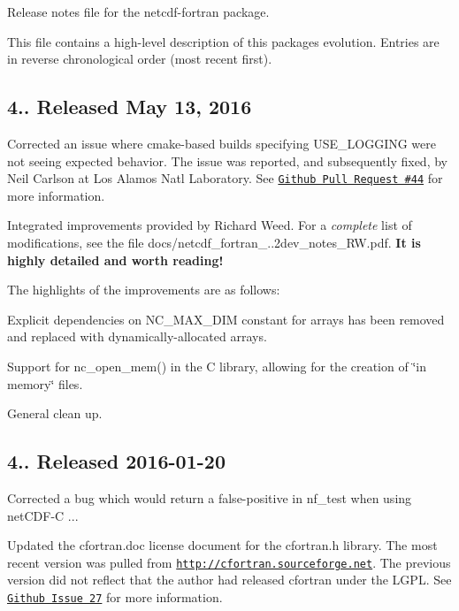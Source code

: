 Release notes file for the netcdf-\/fortran package.

This file contains a high-\/level description of this package\textquotesingle{}s evolution. Entries are in reverse chronological order (most recent first).

\subsection*{4.. Released May 13, 2016}


\begin{DoxyItemize}
\item Corrected an issue where cmake-\/based builds specifying {\ttfamily U\+S\+E\+\_\+\+L\+O\+G\+G\+I\+NG} were not seeing expected behavior. The issue was reported, and subsequently fixed, by Neil Carlson at Los Alamos Nat\textquotesingle{}l Laboratory. See \href{https://github.com/Unidata/netcdf-fortran/pull/44}{\tt Github Pull Request \#44} for more information.
\item Integrated improvements provided by Richard Weed. For a {\itshape complete} list of modifications, see the file {\ttfamily docs/netcdf\+\_\+fortran\+\_..\+2dev\+\_\+notes\+\_\+\+R\+W.\+pdf}. {\bfseries It is highly detailed and worth reading!}

The highlights of the improvements are as follows\+:
\begin{DoxyItemize}
\item Explicit dependencies on {\ttfamily N\+C\+\_\+\+M\+A\+X\+\_\+\+D\+IM} constant for arrays has been removed and replaced with dynamically-\/allocated arrays.
\item Support for {\ttfamily nc\+\_\+open\+\_\+mem()} in the C library, allowing for the creation of \char`\"{}in memory\char`\"{} files.
\item General clean up.
\end{DoxyItemize}
\end{DoxyItemize}

\subsection*{4.. Released 2016-\/01-\/20}


\begin{DoxyItemize}
\item Corrected a bug which would return a false-\/positive in {\ttfamily nf\+\_\+test} when using net\+C\+D\+F-\/C {..}.
\item Updated the {\ttfamily cfortran.\+doc} license document for the {\ttfamily cfortran.\+h} library. The most recent version was pulled from \href{http://cfortran.sourceforge.net}{\tt http\+://cfortran.\+sourceforge.\+net}. The previous version did not reflect that the author had released cfortran under the L\+G\+PL. See \href{https://github.com/Unidata/netcdf-fortran/issues/27}{\tt Github Issue 27} for more information.
\end{DoxyItemize}

